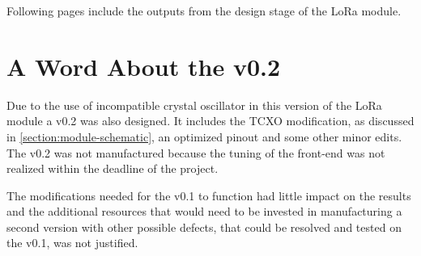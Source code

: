 
Following pages include the outputs from the design stage of the LoRa module.

\section{A Word About the v0.2}
Due to the use of incompatible crystal oscillator in this version of the LoRa module a v0.2 was also designed. It includes the TCXO modification, as discussed in \ref{section:module-schematic}, an optimized pinout and some other minor edits. The v0.2 was not manufactured because the tuning of the front-end was not realized within the deadline of the project. 

The modifications needed for the v0.1 to function had little impact on the results and the additional resources that would need to be invested in manufacturing a second version with other possible defects, that could be resolved and tested on the v0.1, was not justified.

